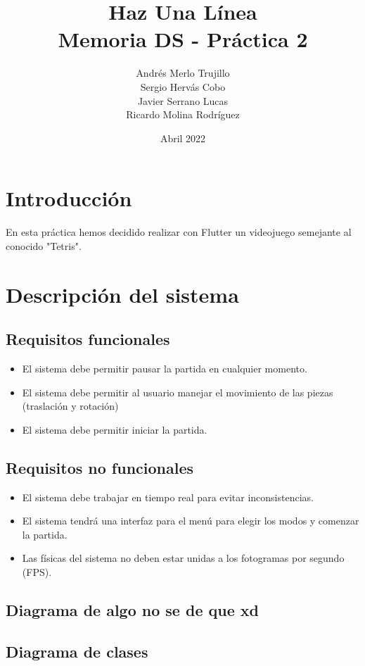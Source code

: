 \documentclass{article}
\title{Haz Una Línea\\
\large Memoria DS - Práctica 2}
\author{Andrés Merlo Trujillo\\ Sergio Hervás Cobo\\ Javier Serrano Lucas\\ Ricardo Molina Rodríguez}
\date{Abril 2022}
\begin{document}
\maketitle
\section{Introducción}
En esta práctica hemos decidido realizar con Flutter un videojuego semejante al conocido "Tetris".

\section{Descripción del sistema}
\subsection{Requisitos funcionales} 
\begin{itemize}
    \item El sistema debe permitir pausar la partida en cualquier
    momento.
    \item El sistema debe permitir al usuario manejar el movimiento de
    las piezas (traslación y rotación)
    \item El sistema debe permitir iniciar la partida.
\end{itemize}
\subsection{Requisitos no funcionales}
\begin{itemize}
    \item El sistema debe trabajar en tiempo real para evitar
    inconsistencias.
    \item El sistema tendrá una interfaz para el menú para elegir los
modos y comenzar la partida.
    \item Las físicas del sistema no deben estar unidas a los fotogramas
por segundo (FPS).
\end{itemize}
\subsection{Diagrama de algo no se de que xd}
\subsection{Diagrama de clases}
\end{document}
